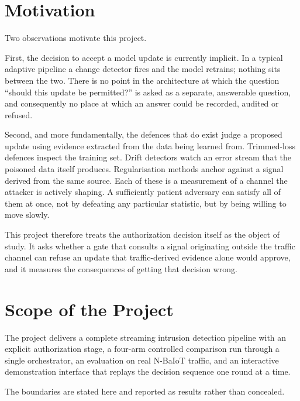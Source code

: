 \documentclass[12pt,a4paper]{report}
\begin{document}
\section{Motivation}

Two observations motivate this project.

First, the decision to accept a model update is currently implicit. In a typical
adaptive pipeline a change detector fires and the model retrains; nothing sits
between the two. There is no point in the architecture at which the question
``should this update be permitted?'' is asked as a separate, answerable
question, and consequently no place at which an answer could be recorded,
audited or refused.

Second, and more fundamentally, the defences that do exist judge a proposed
update using evidence extracted from the data being learned from. Trimmed-loss
defences inspect the training set. Drift detectors watch an error stream that the
poisoned data itself produces. Regularisation methods anchor against a signal
derived from the same source. Each of these is a measurement of a channel the
attacker is actively shaping. A sufficiently patient adversary can satisfy all of
them at once, not by defeating any particular statistic, but by being willing to
move slowly.

This project therefore treats the authorization decision itself as the object of
study. It asks whether a gate that consults a signal originating outside the
traffic channel can refuse an update that traffic-derived evidence alone would
approve, and it measures the consequences of getting that decision wrong.

\section{Scope of the Project}

The project delivers a complete streaming intrusion detection pipeline with an
explicit authorization stage, a four-arm controlled comparison run through a
single orchestrator, an evaluation on real N-BaIoT traffic, and an interactive
demonstration interface that replays the decision sequence one round at a time.

The boundaries are stated here and reported as results rather than concealed.
\end{document}
